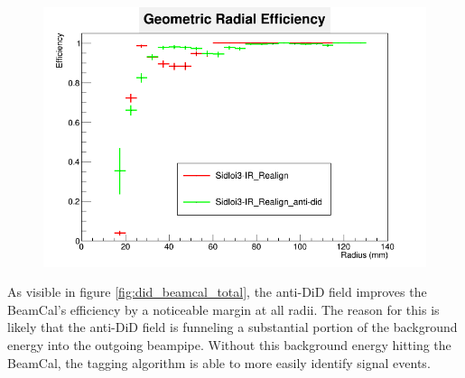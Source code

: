 \documentclass{report}
\begin{document}
                \begin{figure}[H]
                    \includegraphics[width=\textwidth]{RadialEfficiency_geometric_did}
                    \centering
                    \caption{}
                    \label{fig:did_beamcal_geom}
                \end{figure}

                As visible in figure \ref{fig:did_beamcal_total}, the anti-DiD field improves the BeamCal's efficiency by a noticeable margin at all radii. The reason for this is likely that the anti-DiD field is funneling a substantial portion of the background energy into the outgoing beampipe. Without this background energy hitting the BeamCal, the tagging algorithm is able to more easily identify signal events.
\end{document}
